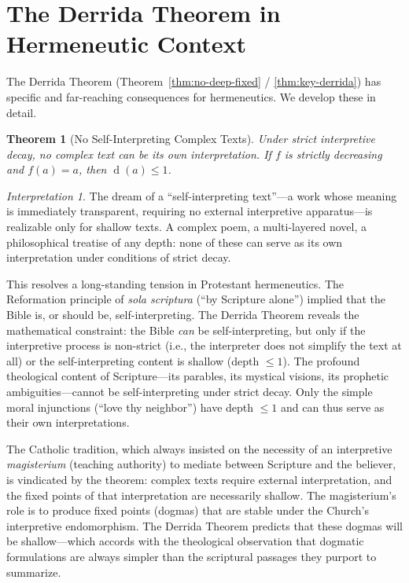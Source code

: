 \documentclass[11pt,openany]{book}
\theoremstyle{definition}
\theoremstyle{plain}
\newtheorem{theorem}[axiom]{Theorem}
\theoremstyle{remark}
\newtheorem{interpretation}[axiom]{Interpretation}
\newcommand{\depth}{\operatorname{d}}       %
\begin{document}
\section{The Derrida Theorem in Hermeneutic Context}

The Derrida Theorem (Theorem~\ref{thm:no-deep-fixed} / \ref{thm:key-derrida}) has specific and far-reaching consequences for hermeneutics. We develop these in detail.

\begin{theorem}[No Self-Interpreting Complex Texts]
Under strict interpretive decay, no complex text can be its own interpretation. If $f$ is strictly decreasing and $f(a) = a$, then $\depth(a) \leq 1$.
\end{theorem}

\begin{interpretation}
The dream of a ``self-interpreting text''---a work whose meaning is immediately transparent, requiring no external interpretive apparatus---is realizable only for shallow texts. A complex poem, a multi-layered novel, a philosophical treatise of any depth: none of these can serve as its own interpretation under conditions of strict decay.

This resolves a long-standing tension in Protestant hermeneutics. The Reformation principle of \textit{sola scriptura} (``by Scripture alone'') implied that the Bible is, or should be, self-interpreting. The Derrida Theorem reveals the mathematical constraint: the Bible \emph{can} be self-interpreting, but only if the interpretive process is non-strict (i.e., the interpreter does not simplify the text at all) or the self-interpreting content is shallow (depth $\leq 1$). The profound theological content of Scripture---its parables, its mystical visions, its prophetic ambiguities---cannot be self-interpreting under strict decay. Only the simple moral injunctions (``love thy neighbor'') have depth $\leq 1$ and can thus serve as their own interpretations.

The Catholic tradition, which always insisted on the necessity of an interpretive \emph{magisterium} (teaching authority) to mediate between Scripture and the believer, is vindicated by the theorem: complex texts require external interpretation, and the fixed points of that interpretation are necessarily shallow. The magisterium's role is to produce fixed points (dogmas) that are stable under the Church's interpretive endomorphism. The Derrida Theorem predicts that these dogmas will be shallow---which accords with the theological observation that dogmatic formulations are always simpler than the scriptural passages they purport to summarize.
\end{interpretation}
\end{document}

